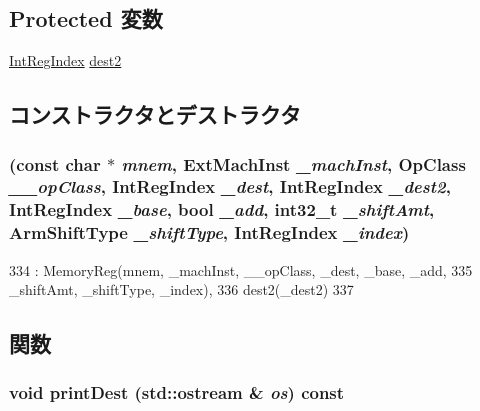 \subsection*{Protected 変数}
\begin{DoxyCompactItemize}
\item 
\hyperlink{namespaceArmISA_ae64680ba9fb526106829d6bf92fc791b}{IntRegIndex} \hyperlink{classArmISA_1_1MemoryDReg_a0425ad33e25c8198da341b8d8c01fcba}{dest2}
\end{DoxyCompactItemize}


\subsection{コンストラクタとデストラクタ}
\hypertarget{classArmISA_1_1MemoryDReg_a0033dd16629fb32e26c385ad8c9615e3}{
\subsubsection[{MemoryDReg}]{ (const char $\ast$ {\em mnem}, \/  {\bf ExtMachInst} {\em \_\-machInst}, \/  OpClass {\em \_\-\_\-opClass}, \/  {\bf IntRegIndex} {\em \_\-dest}, \/  {\bf IntRegIndex} {\em \_\-dest2}, \/  {\bf IntRegIndex} {\em \_\-base}, \/  bool {\em \_\-add}, \/  int32\_\-t {\em \_\-shiftAmt}, \/  {\bf ArmShiftType} {\em \_\-shiftType}, \/  {\bf IntRegIndex} {\em \_\-index})}}
\label{classArmISA_1_1MemoryDReg_a0033dd16629fb32e26c385ad8c9615e3}



\begin{DoxyCode}
334         : MemoryReg(mnem, _machInst, __opClass, _dest, _base, _add,
335                     _shiftAmt, _shiftType, _index),
336           dest2(_dest2)
337     {}
\end{DoxyCode}


\subsection{関数}
\hypertarget{classArmISA_1_1MemoryDReg_adee5df6e5d6b0c498363aabda42431fa}{
\subsubsection[{printDest}]{\setlength{\rightskip}{0pt plus 5cm}void printDest (std::ostream \& {\em os}) const}}
\label{classArmISA_1_1MemoryDReg_adee5df6e5d6b0c498363aabda42431fa}


